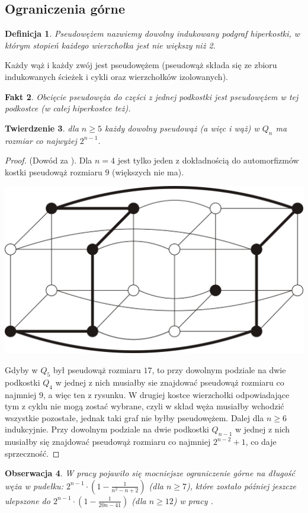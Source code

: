 \documentclass{pracamgr}
\newtheorem{theorem}{Twierdzenie}[chapter]
\newtheorem{defi}[theorem]{Definicja}
\newtheorem{observation}[theorem]{Obserwacja}
\newtheorem{fact}[theorem]{Fakt}
\begin{document}
    \subsection{Ograniczenia górne}
     \begin{defi}\label{pseudowąż}
      \emph{Pseudowężem} nazwiemy dowolny indukowany podgraf hiperkostki, w którym stopień każdego wierzchołka jest nie większy niż 2. 
     \end{defi}
     Każdy wąż i każdy zwój jest pseudowężem (pseudowąż składa się ze zbioru indukowanych ścieżek i cykli oraz wierzchołków izolowanych).
     \begin{fact}
      Obcięcie pseudowęża do części z jednej podkostki jest pseudowężem w tej podkostce (w całej hiperkostce też).
     \end{fact}
    \begin{theorem}
     dla $n\ge5$ każdy dowolny pseudowąż (a więc i wąż) w $Q_n$ ma rozmiar co najwyżej $2^{n-1}$.
    \end{theorem}
    \begin{proof}
     (Dowód za \cite{Snake1}).
     Dla $n=4$ jest tylko jeden z dokładnością do automorfizmów kostki pseudowąż rozmiaru $9$ (większych nie ma).
     \begin{center}
      \includegraphics[scale=0.4]{img/pseudoS_4.jpg}
     \end{center}
     Gdyby w $Q_5$ był pseudowąż rozmiaru $17$, to przy dowolnym podziale na dwie podkostki $Q_4$ w jednej z nich musiałby sie znajdować pseudowąż
     rozmiaru co najmniej $9$, a więc ten z rysunku. W drugiej kostce wierzchołki odpowiadające tym z cyklu nie mogą zostać wybrane,
     czyli w skład węża musiałby wchodzić wszystkie pozostałe, jednak taki graf nie byłby pseudowężem.\newline
     Dalej dla $n\ge6$ indukcyjnie. Przy dowolnym podziale na dwie podkostki $Q_{n-1}$ w jednej z nich musiałby się znajdować pseudowąż rozmiaru co najmniej
     $2^{n-2}+1$, co daje sprzeczność.
    \end{proof}
    \begin{observation}
     W pracy \cite{Snake3} pojawiło się mocniejsze ograniczenie górne na długość węża w pudełku:
     $2^{n-1}\cdot(1-\frac{1}{n^2-n+2})$ (dla $n\ge7$), które zostało później jeszcze ulepszone do\newline
     $2^{n-1}\cdot(1-\frac{1}{20n-41})$ (dla $n\ge12$) w pracy \cite{Snake4}.
    \end{observation}
    \vspace*{30pt}
\end{document}
